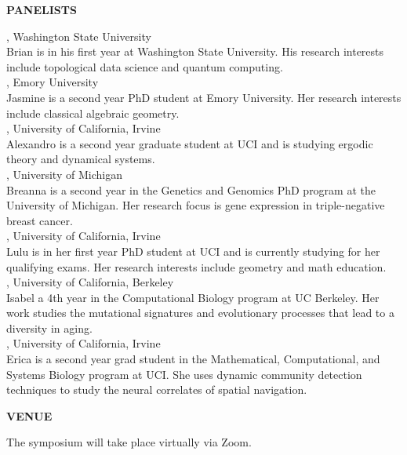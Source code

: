 \documentclass[a4paper]{article}
\begin{document}
\begin{minipage}{0.95\textwidth}
\begin{minipage}[b]{0.47\textwidth}
\par{}\medskip
\textbf{\color{csecondary}\large PANELISTS}\par
\normalsize
\smallskip
{}, Washington State University\\
Brian is in his first year at Washington State University.  His research interests include topological data science and quantum computing.\\
, Emory University\\
Jasmine is a second year PhD student at Emory University.  Her research interests include classical algebraic geometry.\\
, University of California, Irvine\\
Alexandro is a second year graduate student at UCI and is studying ergodic theory and dynamical systems.\\
, University of Michigan\\
Breanna is a second year in the Genetics and Genomics PhD program at the University of Michigan.
Her research focus is gene expression in triple-negative breast cancer.\\
, University of California, Irvine\\
Lulu is in her first year PhD student at UCI and is currently studying for her qualifying exams.
Her research interests include geometry and math education.\\ %
, University of California, Berkeley\\
Isabel a 4th year in the Computational Biology program at UC Berkeley.  Her work studies the mutational signatures and evolutionary processes that lead to a diversity in aging.\\
, University of California, Irvine\\
Erica is a second year grad student in the Mathematical, Computational, and Systems Biology program at UCI.  She uses dynamic community detection techniques to study the neural correlates of spatial navigation.\\
\medskip

\large{\color{csecondary}\textbf{VENUE}}

The symposium will take place virtually via Zoom.

\medskip


\end{minipage}
\end{minipage}
\end{document}
